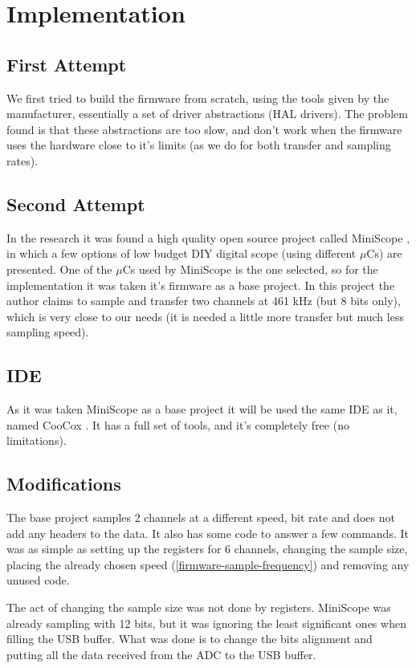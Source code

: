 \section{Implementation}
\label{firmware-implementation}

\subsection{First Attempt}
We first tried to build the firmware from scratch, using the tools given by the
manufacturer, essentially a set of driver abstractions (HAL drivers). The problem
found is that these abstractions are too slow, and don't work when the firmware
uses the hardware close to it's limits (as we do for both transfer and sampling rates).

\subsection{Second Attempt}
In the research it was found a high quality open source project called MiniScope \cite{MiniScope},
in which a few options of low budget DIY digital scope (using different $\mu$Cs) are
presented. One of the $\mu$Cs used by MiniScope is the one selected, so for the
implementation it was taken it's firmware as a base project. In this project the author
claims to sample and transfer two channels at 461 kHz (but 8 bits only), which is
very close to our needs (it is needed a little more transfer but much less sampling speed).

\subsection{IDE}
As it was taken MiniScope as a base project it will be used the same IDE as it, named
CooCox \cite{CooCox}. It has a full set of tools, and it's completely free (no limitations).

\subsection{Modifications}
The base project samples 2 channels at a different speed, bit rate and does not
add any headers to the data. It also has some code to answer a few commands. It
was as simple as setting up the registers for 6 channels, changing the sample size,
placing the already chosen speed (\autoref{firmware-sample-frequency}) and removing
any unused code. 

The act of changing the sample size was not done by registers. MiniScope was already
sampling with 12 bits, but it was ignoring the least significant ones when filling
the USB buffer. What was done is to change the bits alignment and putting all
the data received from the ADC to the USB buffer.

